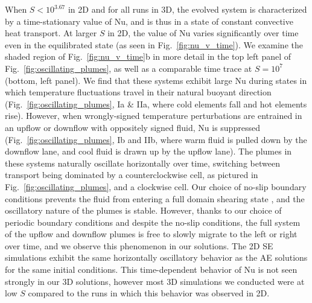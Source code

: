 \documentclass[aps, pre, onecolumn, nofootinbib, notitlepage, groupedaddress, amsfonts, amssymb, amsmath, longbibliography]{revtex4-1}
\begin{document}
When $S < 10^{3.67}$ in 2D and for all runs in 3D, 
the evolved system is characterized by a time-stationary value of Nu, and is thus
in a state of constant convective heat transport.
At larger $S$ in 2D, the value of Nu varies significantly over time even in the
equilibrated state (as seen in Fig.~\ref{fig:nu_v_time}). We examine the shaded
region of Fig.~\ref{fig:nu_v_time}b in more detail in the top left
panel of Fig.~\ref{fig:oscillating_plumes}, as well as a comparable time trace
at $S = 10^7$ (bottom, left panel). We find that these systems exhibit
large Nu during
states in which temperature fluctuations travel in their natural buoyant
direction (Fig.~\ref{fig:oscillating_plumes}, Ia \& IIa, where cold elements fall and hot elements rise).
However, when wrongly-signed temperature perturbations are entrained in an upflow or downflow
with oppositely signed fluid, Nu is suppressed (Fig.~\ref{fig:oscillating_plumes}, Ib and IIb, 
where warm fluid is pulled down by the downflow
lane, and cool fluid is drawn up by the upflow lane).
The plumes in these
systems naturally oscillate horizontally over time, switching between transport being dominated
by a counterclockwise cell, as pictured in Fig.~\ref{fig:oscillating_plumes}, and
a clockwise cell. Our choice of no-slip
boundary conditions prevents the fluid from entering a full domain shearing state 
\cite{goluskin&all2014}, and the
oscillatory nature of the plumes is stable. However, thanks to our choice of periodic
boundary conditions and despite the no-slip conditions, the full system of the
upflow and downflow plumes is free to slowly migrate to the left or right over time,
and we observe this phenomenon in our solutions.
The 2D SE simulations exhibit the same horizontally
oscillatory behavior as the AE solutions for the same initial conditions. 
This time-dependent behavior of Nu is not seen strongly in our 3D solutions,
however most 3D simulations we conducted were at low $S$ compared to the runs in
which this behavior was observed in 2D.
\end{document}
